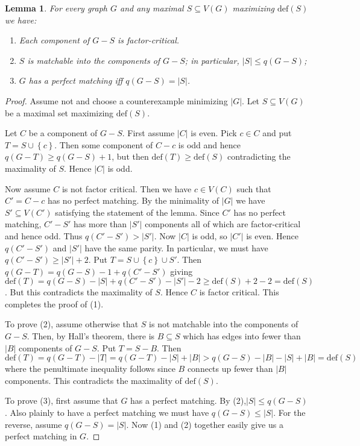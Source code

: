 \documentclass[12pt]{article}
\theoremstyle{plain}
\newtheorem{lem}[thm]{Lemma}
\theoremstyle{definition}
\theoremstyle{remark}
\newcommand{\set}[1]{\left\{ #1 \right\}}
\newcommand{\card}[1]{\left|#1\right|}
\newcommand{\defic}[1]{\text{def}(#1)}
\begin{document}
\begin{lem}\label{FactorCriticalMakingSet}
For every graph $G$ and any maximal $S \subseteq V(G)$ maximizing $\defic{S}$ we have:
\begin{enumerate}
\item Each component of $G-S$ is factor-critical.
\item $S$ is matchable into the components of $G-S$; in particular, $\card{S} \leq q(G-S)$;
\item $G$ has a perfect matching iff $q(G-S) = \card{S}$.
\end{enumerate}
\end{lem}
\begin{proof}
Assume not and choose a counterexample minimizing $\card{G}$.  Let $S \subseteq V(G)$ be a maximal set maximizing $\defic{S}$.  

Let $C$ be a component of $G - S$.  First assume $\card{C}$ is even.  Pick $c \in C$ and put $T = S \cup \set{c}$.  Then some component of $C - c$ is odd and hence $q(G-T) \geq q(G - S) + 1$, but then $\defic{T} \geq \defic{S}$ contradicting the maximality of $S$.  Hence $\card{C}$ is odd.

Now assume $C$ is not factor critical.  Then we have $c \in V(C)$ such that $C' = C - c$ has no perfect matching.  By the minimality of $\card{G}$ we have $S' \subseteq V(C')$ satisfying the statement of the lemma.  Since $C'$ has no perfect matching, $C'-S'$ has more than $\card{S'}$ components all of which are factor-critical and hence odd.  Thus $q(C'-S') > \card{S'}$.  Now $\card{C}$ is odd, so $\card{C'}$ is even.  Hence $q(C'-S')$ and $\card{S'}$ have the same parity.  In particular, we must have $q(C'-S') \geq \card{S'} + 2$.  Put $T = S \cup \set{c} \cup S'$.  Then $q(G - T) = q(G - S) - 1 + q(C'-S')$ giving $\defic{T} = q(G - S) - \card{S} + q(C'-S') - \card{S'} - 2 \geq \defic{S} + 2- 2 = \defic{S}$.  But this contradicts the maximality of $S$.   Hence $C$ is factor critical.  This completes the proof of (1).

To prove (2), assume otherwise that $S$ is not matchable into the components of $G-S$.  Then, by Hall's theorem, there is $B \subseteq S$ which has edges into fewer than $\card{B}$ components of $G-S$.  Put $T = S - B$.  Then $\defic{T} = q(G-T) - \card{T} = q(G-T) - \card{S} + \card{B} > q(G-S) - \card{B} - \card{S} + \card{B} = \defic{S}$ where the penultimate inequality follows since $B$ connects up fewer than $\card{B}$ components.  This contradicts the maximality of $\defic{S}$.

To prove (3), first assume that $G$ has a perfect matching.  By (2),$\card{S} \leq q(G-S)$.  Also plainly to have a perfect matching we must have $q(G-S) \leq \card{S}$.  For the reverse, assume $q(G-S) = \card{S}$.  Now (1) and (2) together easily give us a perfect matching in $G$.
\end{proof}
\end{document}
